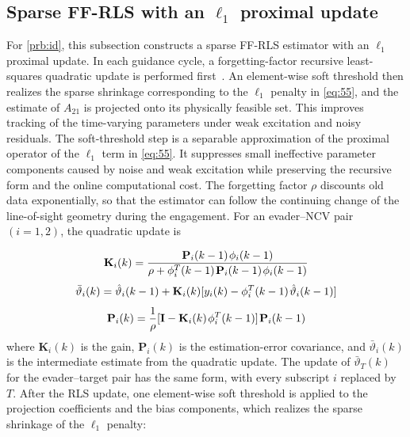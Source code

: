 \subsection{Sparse FF-RLS with an ${\ell _1}$ proximal update}
For \cref{prb:id}, this subsection constructs a sparse FF-RLS estimator with an ${\ell _1}$ proximal update. In each guidance cycle, a forgetting-factor recursive least-squares quadratic update is performed first~\cite{ljung1999,johnstone1982}. An element-wise soft threshold then realizes the sparse shrinkage corresponding to the ${\ell _1}$ penalty in \eqref{eq:55}, and the estimate of ${A_{21}}$ is projected onto its physically feasible set. This improves tracking of the time-varying parameters under weak excitation and noisy residuals. The soft-threshold step is a separable approximation of the proximal operator of the ${\ell _1}$ term in \eqref{eq:55}. It suppresses small ineffective parameter components caused by noise and weak excitation while preserving the recursive form and the online computational cost. The forgetting factor $\rho$ discounts old data exponentially, so that the estimator can follow the continuing change of the line-of-sight geometry during the engagement. For an evader--NCV pair $(i = 1,2)$, the quadratic update is

\begin{equation}
\label{eq:57}
{{\mathbf{K}}_i}(k) = \frac{{{{\mathbf{P}}_i}(k - 1){\kern 1pt} {\phi _i}(k - 1)}}{{\rho  + \phi _i^T(k - 1){\kern 1pt} {{\mathbf{P}}_i}(k - 1){\kern 1pt} {\phi _i}(k - 1)}}
\end{equation}
\begin{equation}
\label{eq:58}
\bar{\vartheta}_{i}(k) = \hat{\vartheta}_{i}(k - 1) + {{\mathbf{K}}_i}(k)[{y_i}(k) - \phi _i^T(k - 1){\kern 1pt} \hat{\vartheta}_{i}(k - 1)]
\end{equation}
\begin{equation}
\label{eq:59}
{{\mathbf{P}}_i}(k) = \frac{1}{\rho }[{\mathbf{I}} - {{\mathbf{K}}_i}(k){\kern 1pt} \phi _i^T(k - 1)]{\kern 1pt} {{\mathbf{P}}_i}(k - 1)
\end{equation}
where ${{\mathbf{K}}_i}(k)$ is the gain, ${{\mathbf{P}}_i}(k)$ is the estimation-error covariance, and $\bar{\vartheta}_{i}(k)$ is the intermediate estimate from the quadratic update. The update of $\bar{\vartheta}_{T}(k)$ for the evader--target pair has the same form, with every subscript $i$ replaced by $T$. After the RLS update, one element-wise soft threshold is applied to the projection coefficients and the bias components, which realizes the sparse shrinkage of the ${\ell _1}$ penalty:

